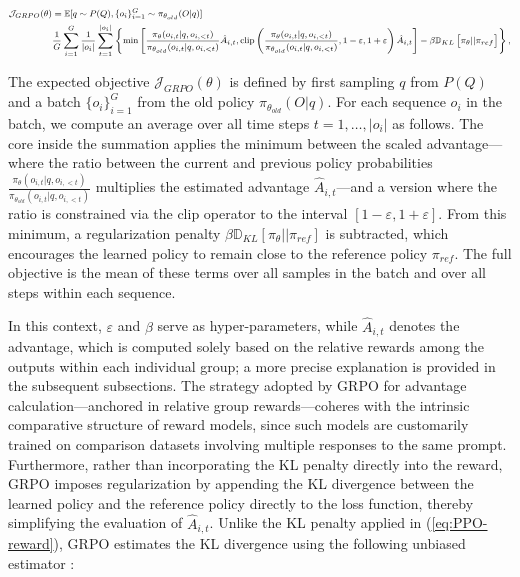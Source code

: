 \begin{itemize}[topsep=0pt]
\begin{itemize}[topsep=0pt]
\begin{equation}
\footnotesize
\begin{split}
    \mathcal{J}_{GRPO}(\theta) &= \mathbb{E}{[q \sim P(Q), \{o_i\}_{i=1}^G \sim \pi_{\theta_{old}}(O|q)]}  \\
    & \frac{1}{G}\sum_{i=1}^G\frac{1}{|o_i|} \sum_{t=1}^{|o_i|} \left\{ \min \left[ \frac{\pi_\theta(o_{i,t} | q, o_{i,<t})}{\pi_{\theta_{old}}(o_{i,t} | q, o_{i,<t})} \hat{A}_{i,t}, \text{clip} \left( \frac{\pi_\theta(o_{i,t} | q, o_{i,<t})}{\pi_{\theta_{old}}(o_{i,t} | q, o_{i,<t})}, 1 - \varepsilon, 1 + \varepsilon \right)  \hat{A}_{i,t} \right] - \beta \mathbb{D}_{KL}\left[\pi_{\theta} || \pi_{ref}\right]\right\} ,
\end{split}
\label{eq:GRPO-obj}
\end{equation}

The expected objective $\mathcal{J}_{GRPO}(\theta)$ is defined by first sampling $q$ from $P(Q)$ and a batch $\{o_i\}_{i=1}^G$ from the old policy $\pi_{\theta_{old}}(O|q)$. For each sequence $o_i$ in the batch, we compute an average over all time steps $t=1,\ldots,|o_i|$ as follows. The core inside the summation applies the minimum between the scaled advantage—where the ratio between the current and previous policy probabilities $\frac{\pi_\theta(o_{i,t} | q, o_{i,<t})}{\pi_{\theta_{old}}(o_{i,t} | q, o_{i,<t})}$ multiplies the estimated advantage $\hat{A}_{i,t}$—and a version where the ratio is constrained via the $\text{clip}$ operator to the interval $[1 - \varepsilon, 1 + \varepsilon]$. From this minimum, a regularization penalty $\beta \mathbb{D}_{KL}\left[\pi_{\theta} || \pi_{ref}\right]$ is subtracted, which encourages the learned policy to remain close to the reference policy $\pi_{ref}$. The full objective is the mean of these terms over all samples in the batch and over all steps within each sequence.

In this context, $\varepsilon$ and $\beta$ serve as hyper-parameters, while $\hat{A}_{i,t}$ denotes the advantage, which is computed solely based on the relative rewards among the outputs within each individual group; a more precise explanation is provided in the subsequent subsections. The strategy adopted by GRPO for advantage calculation—anchored in relative group rewards—coheres with the intrinsic comparative structure of reward models, since such models are customarily trained on comparison datasets involving multiple responses to the same prompt. Furthermore, rather than incorporating the KL penalty directly into the reward, GRPO imposes regularization by appending the KL divergence between the learned policy and the reference policy directly to the loss function, thereby simplifying the evaluation of $\hat{A}_{i,t}$. Unlike the KL penalty applied in (\ref{eq:PPO-reward}), GRPO estimates the KL divergence using the following unbiased estimator \citep{kl_approx}:


\end{itemize}
\end{itemize}
